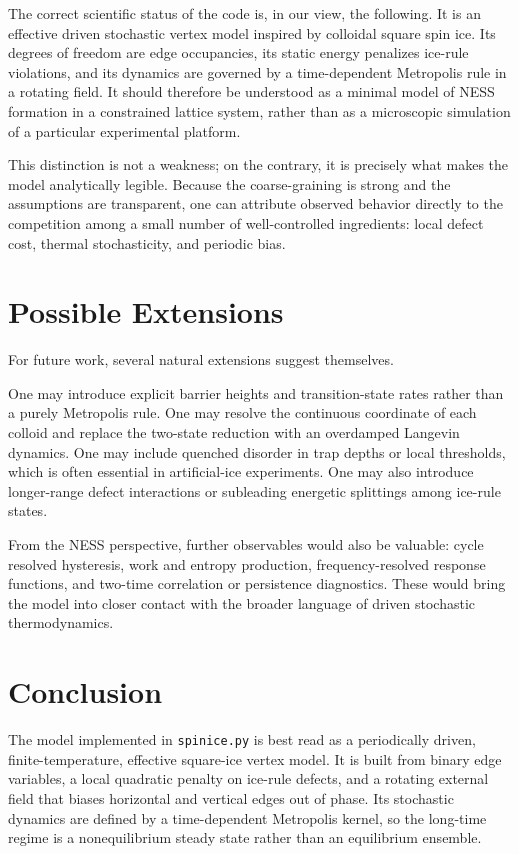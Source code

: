 \documentclass[11pt]{article}
\begin{document}
The correct scientific status of the code is, in our view, the following. It is
an effective driven stochastic vertex model inspired by colloidal square spin
ice. Its degrees of freedom are edge occupancies, its static energy penalizes
ice-rule violations, and its dynamics are governed by a time-dependent
Metropolis rule in a rotating field. It should therefore be understood as a
minimal model of NESS formation in a constrained lattice system, rather than as
a microscopic simulation of a particular experimental platform.

This distinction is not a weakness; on the contrary, it is precisely what makes
the model analytically legible. Because the coarse-graining is strong and the
assumptions are transparent, one can attribute observed behavior directly to the
competition among a small number of well-controlled ingredients: local defect
cost, thermal stochasticity, and periodic bias.

\section{Possible Extensions}

For future work, several natural extensions suggest themselves.

One may introduce explicit barrier heights and transition-state rates rather than
a purely Metropolis rule. One may resolve the continuous coordinate of each
colloid and replace the two-state reduction with an overdamped Langevin
dynamics. One may include quenched disorder in trap depths or local thresholds,
which is often essential in artificial-ice experiments. One may also introduce
longer-range defect interactions or subleading energetic splittings among
ice-rule states.

From the NESS perspective, further observables would also be valuable: cycle
resolved hysteresis, work and entropy production, frequency-resolved response
functions, and two-time correlation or persistence diagnostics. These would
bring the model into closer contact with the broader language of driven
stochastic thermodynamics.

\section{Conclusion}

The model implemented in \texttt{spinice.py} is best read as a periodically
driven, finite-temperature, effective square-ice vertex model. It is built from
binary edge variables, a local quadratic penalty on ice-rule defects, and a
rotating external field that biases horizontal and vertical edges out of phase.
Its stochastic dynamics are defined by a time-dependent Metropolis kernel, so
the long-time regime is a nonequilibrium steady state rather than an equilibrium
ensemble.
\end{document}
